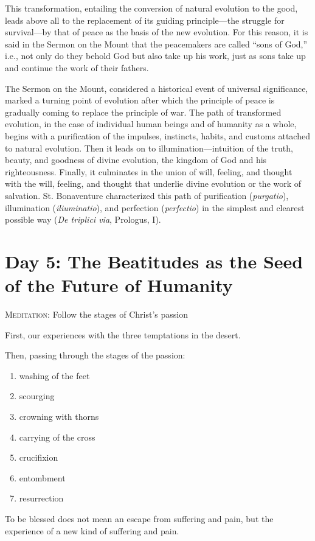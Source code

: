 \begin{quotex}
This transformation, entailing the conversion of natural evolution to the good, leads above all to the replacement of its guiding principle—the struggle for survival—by that of peace as the basis of the new evolution. For this reason, it is said in the Sermon on the Mount that the peacemakers are called ``sons of God,'' i.e., not only do they behold God but also take up his work, just as sons take up and continue the work of their fathers. 

\end{quotex}
The Sermon on the Mount, considered a historical event of universal significance, marked a turning point of evolution after which the principle of peace is gradually coming to replace the principle of war. The path of transformed evolution, in the case of individual human beings and of humanity as a whole, begins with a purification of the impulses, instincts, habits, and customs attached to natural evolution. Then it leads on to illumination—intuition of the truth, beauty, and goodness of divine evolution, the kingdom of God and his righteousness. Finally, it culminates in the union of will, feeling, and thought with the will, feeling, and thought that underlie divine evolution or the work of salvation. St. Bonaventure characterized this path of purification (\emph{purgatio}), illumination (\emph{iliuminatio}), and perfection (\emph{perfectio}) in the simplest and clearest possible way (\emph{De triplici via}, Prologus, I).

\section{Day 5: The Beatitudes as the Seed of the Future of Humanity}

\textsc{Meditation}: Follow the stages of Christ's passion

First, our experiences with the three temptations in the desert.

Then, passing through the stages of the passion:

\begin{enumerate}
\item washing of the feet 
\item scourging 
\item crowning with thorns 
\item carrying of the cross 
\item crucifixion 
\item entombment 
\item resurrection 
\end{enumerate}
To be blessed does not mean an escape from suffering and pain, but the experience of a new kind of suffering and pain.

